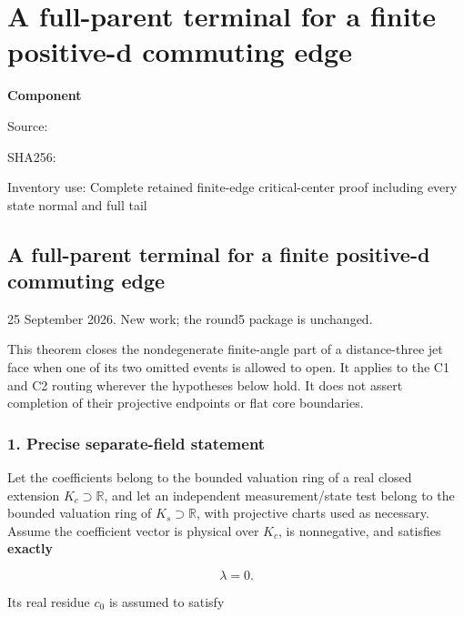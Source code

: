 \chapter{A full-parent terminal for a finite positive-d commuting edge}
\label{component:p4ec1a51262f9}
\noindent\textbf{Component }\par
{\small\noindent Source: \par}
{\small\noindent SHA256: \par}
{\small\noindent Inventory use: Complete retained finite-edge critical-center proof including every state normal and full tail\par}
\medskip
\hypertarget{a-full-parent-terminal-for-a-finite-positive-d-commuting-edge}{%
\section{A full-parent terminal for a finite positive-d commuting edge}\label{p4ec1a51262f9:a-full-parent-terminal-for-a-finite-positive-d-commuting-edge}}

25 September 2026. New work; the round5 package is unchanged.

This theorem closes the nondegenerate finite-angle part of a distance-three
jet face when one of its two omitted events is allowed to open. It applies
to the C1 and C2 routing wherever the hypotheses below hold. It does not
assert completion of their projective endpoints or flat core boundaries.

\hypertarget{precise-separate-field-statement}{%
\subsection{1. Precise separate-field statement}\label{p4ec1a51262f9:precise-separate-field-statement}}

Let the coefficients belong to the bounded valuation ring of a real closed
extension \(K_c\supset\mathbb R\), and let an independent measurement/state
test belong to the bounded valuation ring of \(K_s\supset\mathbb R\), with
projective charts used as necessary. Assume the coefficient vector is
physical over \(K_c\), is nonnegative, and satisfies \textbf{exactly}

\[
\lambda=0.
\]

Its real residue \(c_0\) is assumed to satisfy


